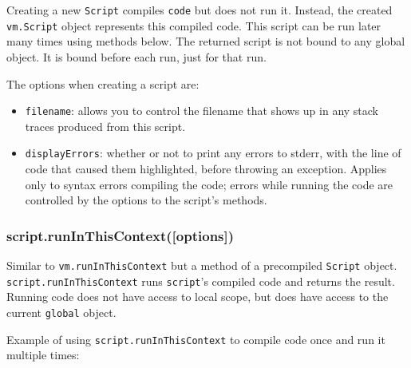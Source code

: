Creating a new \texttt{Script} compiles \texttt{code} but does not run
it. Instead, the created \texttt{vm.Script} object represents this
compiled code. This script can be run later many times using methods
below. The returned script is not bound to any global object. It is
bound before each run, just for that run.

The options when creating a script are:

\begin{itemize}
\itemsep1pt\parskip0pt
\item
  \texttt{filename}: allows you to control the filename that shows up in
  any stack traces produced from this script.
\item
  \texttt{displayErrors}: whether or not to print any errors to stderr,
  with the line of code that caused them highlighted, before throwing an
  exception. Applies only to syntax errors compiling the code; errors
  while running the code are controlled by the options to the script's
  methods.
\end{itemize}

\subsubsection{script.runInThisContext({[}options{]})}\label{script.runinthiscontextoptions}

Similar to \texttt{vm.runInThisContext} but a method of a precompiled
\texttt{Script} object. \texttt{script.runInThisContext} runs
\texttt{script}'s compiled code and returns the result. Running code
does not have access to local scope, but does have access to the current
\texttt{global} object.

Example of using \texttt{script.runInThisContext} to compile code once
and run it multiple times:

\begin{Shaded}
\begin{Highlighting}[]
 \NormalTok{(}\NormalTok{);}

 \NormalTok{= }\NormalTok{;}

  \NormalTok{(}\NormalTok{, \{ }\NormalTok{: } \NormalTok{\});}

 \NormalTok{(} 
  \NormalTok{();}
\NormalTok{\}}


\end{Highlighting}
\end{Shaded}

